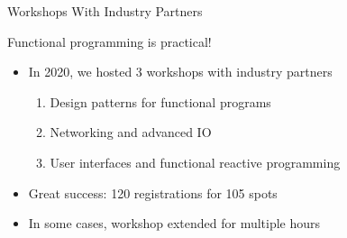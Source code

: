 \documentclass{beamer}
\begin{document}
\begin{frame}{Workshops With Industry Partners}
\vspace{\baselineskip}

\centerline{\Large{\alert{Functional programming is practical!}}}
\pause
\begin{itemize}
\item In 2020, we hosted 3 workshops with industry partners
\begin{enumerate}[<3->]
  \item Design patterns for functional programs
  \item Networking and advanced IO
  \item User interfaces and functional reactive programming
\end{enumerate}
\item<4-> Great success: 120 registrations for 105 spots
\item<5-> In some cases, workshop extended for multiple hours
\end{itemize}
\end{frame}

\end{document}
